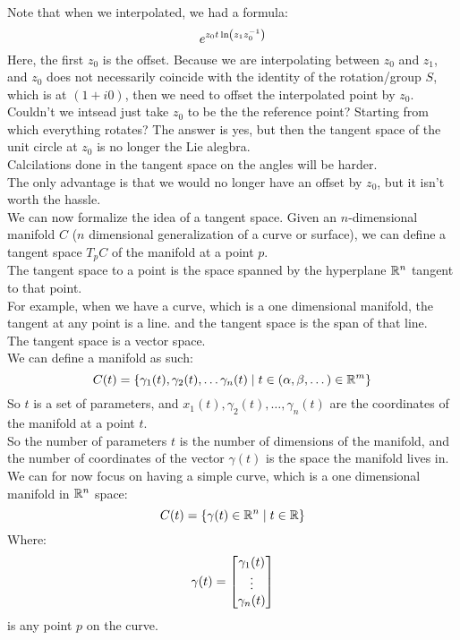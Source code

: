 \documentclass[12pt]{article}
\begin{document}
Note that when we interpolated,
we had a formula:
\[ e^{{z_0t\ln\left( z_1z_0^{-1} \right)}} \]
Here, the first $z_0$ is the offset.
Because we are interpolating between $z_0$
and $z_1$, and $z_0$
does not necessarily coincide with the
identity of the rotation/group $S$,
which is at $(1 + i0)$,
then we need to offset the interpolated point
by $z_0$. \\
Couldn't we intsead just take $z_0$ to
be the the reference point?
Starting from which everything rotates?
The answer is yes, but then the tangent
space of the unit circle at $z_0$
is no longer the Lie alegbra. \\
Calcilations done in the tangent space 
on the angles will be harder. \\
The only advantage is that we would no longer
have an offset by $z_0$,
but it isn't worth the hassle. \\

We can now formalize the idea of a tangent space.
Given an $n$-dimensional manifold $C$
($n$ dimensional
generalization of a curve or surface),
we can define a tangent space
$T_pC$ of the manifold at a point $p$. \\
The tangent space to a point is the space spanned
by the hyperplane $\mathbb{R}^{n}$
tangent to that point. \\
For example, when we have a curve,
which is a one dimensional manifold,
the tangent at any point is a line.
and the tangent space is the span
of that line. \\

The tangent space is a vector space. \\

We can define a manifold as such:
\[ C(t) = \{\gamma_1(t),\gamma_2(t), 
\dots\gamma_n(t) \mid
t \in (\alpha, \beta, \dots) \in \mathbb{R}^m \} \]
So $t$ is a set of parameters,
and $x_1(t),\gamma_2(t), \dots,\gamma_n(t)$
are the coordinates of the manifold at
a point $t$. \\

So the number of parameters $t$ is the number
of dimensions of the manifold,
and the number of coordinates of the
vector $\gamma(t)$ is the space
the manifold lives in. \\

We can for now focus on having a simple
curve, which is a one dimensional manifold
in $\mathbb{R}^n$ space:
\[ C(t) = \{\gamma(t) \in \mathbb{R}^n \mid t \in \mathbb{R} \} \]
Where:
\[ \gamma(t) = \begin{bmatrix} {\gamma_1(t)} \\
{\vdots} \\ {\gamma_n(t)} \end{bmatrix} \]
is any point $p$ on the curve. \\
\end{document}
